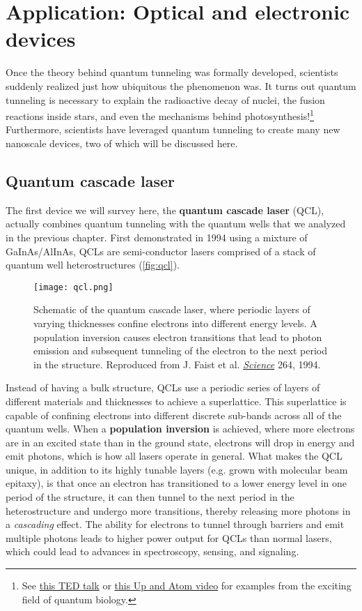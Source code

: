 \section[Application: Devices]{Application: Optical and electronic devices}

Once the theory behind quantum tunneling was formally developed, scientists suddenly realized just how ubiquitous the phenomenon was. 
It turns out quantum tunneling is necessary to explain the radioactive decay of nuclei, the fusion reactions inside stars, and even the mechanisms behind photosynthesis!\footnote{See \href{https://www.youtube.com/watch?v=_qgSz1UmcBM}{this TED talk} or \href{https://www.youtube.com/watch?v=Zc9Xk99gCr4}{this Up and Atom video} for examples from the exciting field of quantum biology.}
Furthermore, scientists have leveraged quantum tunneling to create many new nanoscale devices, two of which will be discussed here.

\subsection{Quantum cascade laser}
The first device we will survey here, the \textbf{quantum cascade laser} (QCL), actually combines quantum tunneling with the quantum wells that we analyzed in the previous chapter. 
First demonstrated in 1994 using a mixture of GaInAs/AlInAs, QCLs are semi-conductor lasers comprised of a stack of quantum well heterostructures (\autoref{fig:qcl}).

\begin{figure}[!h]
	\centering
	\texttt{[image: qcl.png]}
	\caption{Schematic of the quantum cascade laser, where periodic layers of varying thicknesses confine electrons into different energy levels. 
	A population inversion causes electron transitions that lead to photon emission and subsequent tunneling of the electron to the next period in the structure. 
	Reproduced from J. Faist et al. \href{http://science.sciencemag.org/content/264/5158/553}{\emph{Science}} 264, 1994.}
	\label{fig:qcl}
\end{figure}

Instead of having a bulk structure, QCLs use a periodic series of layers of different materials and thicknesses to achieve a superlattice. 
This superlattice is capable of confining electrons into different discrete sub-bands across all of the quantum wells. 
When a \textbf{population inversion} is achieved, where more electrons are in an excited state than in the ground state, electrons will drop in energy and emit photons, which is how all lasers operate in general. 
What makes the QCL unique, in addition to its highly tunable layers (e.g. grown with molecular beam epitaxy), is that once an electron has transitioned to a lower energy level in one period of the structure, it can then tunnel to the next period in the heterostructure and undergo more transitions, thereby releasing more photons in a \emph{cascading} effect. 
The ability for electrons to tunnel through barriers and emit multiple photons leads to higher power output for QCLs than normal lasers, which could lead to advances in spectroscopy, sensing, and signaling.


